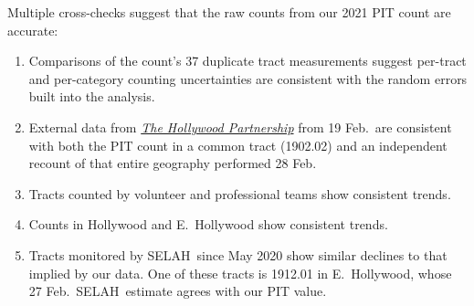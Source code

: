 \documentclass[11pt]{article}
\def\selah{SELAH}
\begin{document}
Multiple cross-checks suggest that the raw counts from our 2021 PIT count are accurate:
\begin{enumerate}
	\item Comparisons of the count's 37 duplicate tract measurements suggest per-tract and per-category
		counting uncertainties are consistent with the random errors built into the analysis.
	\item External data from \href{https://hollywoodpartnership.com/}{\it The Hollywood Partnership} 
		from 19 Feb.\ are consistent with both the PIT count in a common tract (1902.02) and an independent 
		recount of that entire geography performed 28 Feb.%
	\item Tracts counted by volunteer and professional teams show consistent trends.
	\item Counts in Hollywood and E.~Hollywood show consistent trends.%
	\item Tracts monitored by \selah\ since May 2020 show similar declines to that implied by our data. 
		One of these tracts is 1912.01 in E.~Hollywood, whose 27 Feb.\ \selah\ estimate  agrees with our 
		PIT value.%
\end{enumerate}

%
%
%
\end{document}
